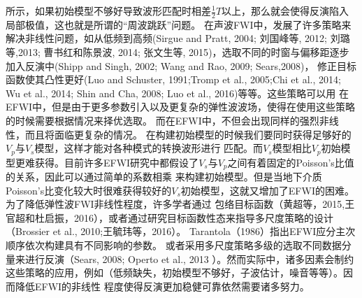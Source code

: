 所示，如果初始模型不够好导致波形匹配时相差$\frac{1}{2}T$以上，那么就会使得反演陷入局部极值，这也就是所谓的“周波跳跃”问题。
在声波FWI中，发展了许多策略来解决非线性问题，如从低频到高频(Sirgue and
Pratt, 2004\cite{sirgue.pratt:2004}; 刘国峰等, 2012\cite{刘国峰2012};
刘璐等,2013\cite{刘璐2013}; 曹书红和陈景波, 2014\cite{曹书红2014}; 
张文生等, 2015\cite{张文生2015})，选取不同的时窗与偏移距逐步加入反演中(Shipp and
Singh, 2002\cite{shipp:2002}; Wang and Rao, 2009\cite{WangEtAl2009}; Sears,2008\cite{sears2008})，
修正目标函数使其凸性更好(Luo and Schuster, 1991\cite{luo1991};Tromp et al.,
2005\cite{tromp2005seismic};Chi
et al., 2014\cite{ChiEtAl2014}; Wu et al., 2014\cite{Wu2014b}; Shin and Cha,
2008\cite{shin.cha:2008}; Luo et al., 2016\cite{Luo2016})等等。这些策略可以用
在EFWI中，但是由于更多参数引入以及更复杂的弹性波波场，使得在使用这些策略的时候需要根据情况来择优选取。
而在EFWI中，不但会出现同样的强烈非线性，而且将面临更复杂的情况。
在构建初始模型的时候我们要同时获得足够好的$V_p$与$V_s$模型，这样才能对各种模式的转换波形进行
匹配。而$V_s$模型相比$V_p$初始模型更难获得。目前许多EFWI研究中都假设了$V_s$与$V_p$之间有着固定的Poisson's比值的关系，因此可以通过简单的系数相乘
来构建初始模型。但是当地下介质Poisson's比变化较大时很难获得较好的$V_s$初始模型，这就又增加了EFWI的困难。为了降低弹性波FWI非线性程度，许多学者通过
包络目标函数（黄超等，2015\cite{黄超2015},王官超和杜启振，2016\cite{王官超2016}），或者通过研究目标函数性态来指导多尺度策略的设计
（Brossier et al., 2010\cite{BrossierEtAl2010};王毓玮等，2016\cite{王毓玮2016}）。
Tarantola（1986）\cite{tarantola:1986}指出EFWI应分主次顺序依次构建具有不同影响的参数。
或者采用多尺度策略多级的选取不同数据分量来进行反演（Sears, 2008\cite{sears2008}; Operto et al., 2013
\cite{operto2013guided}）。然而实际中，诸多因素会制约这些策略的应用，例如（低频缺失，初始模型不够好，子波估计，噪音等等）。因而降低EFWI的非线性
程度使得反演更加稳健可靠依然需要诸多努力。


